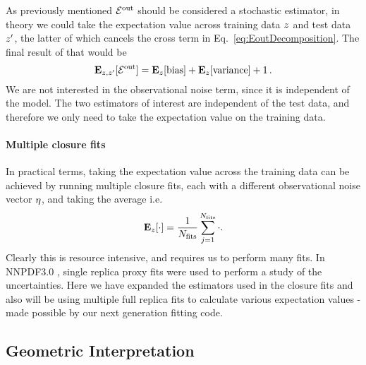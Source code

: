 As previously mentioned $\mathcal{E}^{\rm out}$ should be considered a stochastic estimator, in
theory we could take the expectation value across training data $z$ and
test data $z^{\prime}$, the latter of which cancels the cross term in
Eq.~\ref{eq:EoutDecomposition}. The final result of that would be
\begin{equation}\label{eq:ExpectedBiasVariance}
    \mathbf{E}_{z, z^\prime}[\mathcal{E}^{\rm out}] =
    \mathbf{E}_{z}[{\rm bias}] + 
    \mathbf{E}_{z}[{\rm variance}] + 1\, .
\end{equation}
We are not interested in the observational noise term, since it is
independent of the model. The two estimators of interest are independent of
the test data, and therefore we only need to take the expectation value on
the training data.
\paragraph{Multiple closure fits}
In practical terms, taking the expectation value across the training data can
be achieved by running multiple closure fits, each with a different
observational noise vector $\eta$, and taking the average i.e.
\begin{equation}
    \mathbf{E}_{z}[ \cdot ] = \frac{1}{N_{\rm fits}} \sum_{j=1}^{N_{\rm fits}} \cdot.
\end{equation}
Clearly this is resource intensive, and requires us to perform many fits. In
NNPDF3.0 \cite{nnpdf30}, single replica proxy fits were used to perform a study
of the uncertainties. Here we have expanded the estimators used in the closure
fits and also will be using multiple full replica fits to calculate various
expectation values - made possible by our next generation fitting code.

\subsection{Geometric Interpretation}

